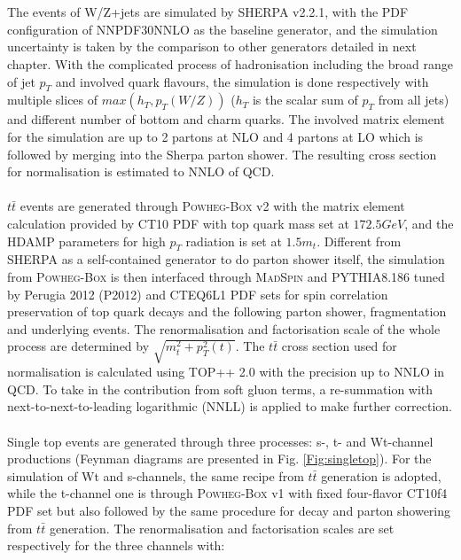\\
\\The events of W/Z+jets are simulated by \textsc{SHERPA} v2.2.1, with the PDF configuration of \textsc{NNPDF30NNLO} as the baseline generator, and the simulation uncertainty is taken by the comparison to other generators detailed in next chapter. With the complicated process of hadronisation including the broad range of jet $p_{T}$ and involved quark flavours, the simulation is done respectively with multiple slices of $max(h_{T}, p_{T}(W/Z))$ ($h_{T}$ is the scalar sum of $p_{T}$ from all jets) and different number of bottom and charm quarks. The involved matrix element for the simulation are up to 2 partons at NLO and 4 partons at LO which is followed by merging into the Sherpa parton shower. The resulting cross section for normalisation is estimated to NNLO of QCD.
\\
\\$t\bar{t}$ events are generated through \textsc{Powheg-Box} v2 with the matrix element calculation provided by \textsc{CT10 PDF} with top quark mass set at $172.5GeV$, and the \textsc{HDAMP} parameters for high $p_{T}$ radiation is set at $1.5m_{t}$. Different from \textsc{SHERPA} as a self-contained generator to do parton shower itself, the simulation from \textsc{Powheg-Box} is then interfaced through \textsc{MadSpin} and \textsc{PYTHIA}8.186 tuned by Perugia 2012 (P2012) and \textsc{CTEQ6L1 PDF} sets for spin correlation preservation of top quark decays and the following parton shower, fragmentation and underlying events. The renormalisation and factorisation scale of the whole process are determined by $\sqrt{m_{t}^2+p^2_{T}(t)}$. The $t\bar{t}$ cross section used for normalisation is calculated using \textsc{TOP++} 2.0 with the precision up to NNLO in QCD. To take in the contribution from soft gluon terms, a re-summation with next-to-next-to-leading logarithmic (NNLL) is applied to make further correction.  
\\
\\Single top events are generated through three processes: s-, t- and Wt-channel productions (Feynman diagrams are presented in Fig. \ref{Fig:singletop}). For the simulation of Wt and s-channels, the same recipe from $t\bar{t}$ generation is adopted, while the t-channel one is through \textsc{Powheg-Box} v1 with fixed four-flavor CT10f4 PDF set but also followed by the same procedure for decay and parton showering from $t\bar{t}$ generation. The renormalisation and factorisation scales are set respectively for the three channels with:
